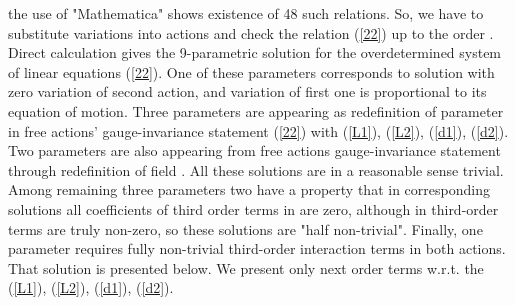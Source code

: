 \documentclass[a4paper,12pt]{article}
\begin{document}
the use of "Mathematica" shows existence of 48 such relations.
    So, we have to substitute variations into actions and check
the relation (\ref{22}) up to the order \coordHE{}. Direct calculation  gives the 9-parametric solution for the
overdetermined system of linear equations (\ref{22}). One of these
parameters corresponds to solution with zero variation of second
action, and variation of first one is proportional to its equation
of motion. Three parameters are appearing as redefinition of
parameter \coordHE{} in free actions'
gauge-invariance statement (\ref{22}) with (\ref{L1}), (\ref{L2}),
(\ref{d1}), (\ref{d2}). Two parameters are also appearing from
free actions gauge-invariance statement through redefinition of
field \coordHE{}. All these solutions are in a reasonable
sense trivial. Among remaining three parameters two have a
property that in corresponding solutions all coefficients of third
order terms in \coordHE{} are zero, although in \coordHE{} third-order
terms are truly non-zero, so these solutions are "half
non-trivial". Finally, one parameter requires fully non-trivial
third-order interaction terms in both actions. That solution is
presented below. We present only next order terms w.r.t. the
(\ref{L1}), (\ref{L2}), (\ref{d1}), (\ref{d2}).
\end{document}
